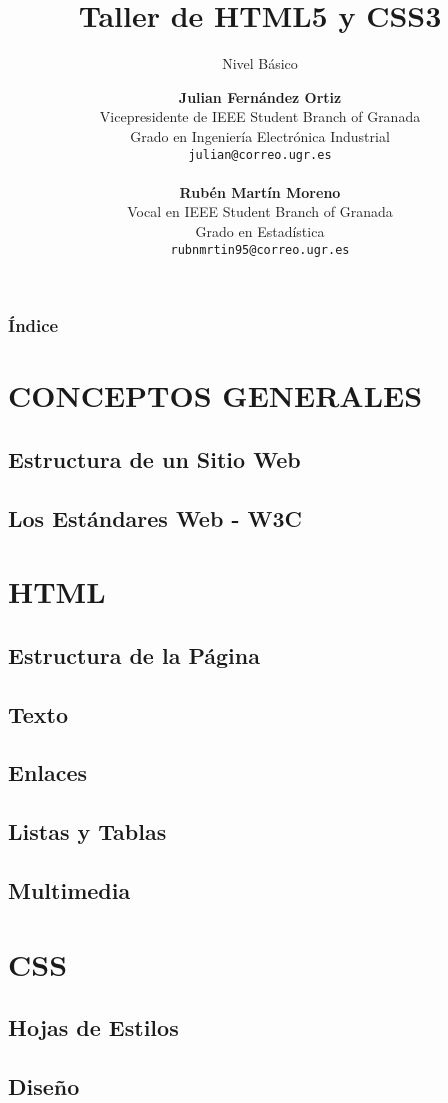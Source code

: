 \documentclass{beamer}
\title[HTML y CSS]{Taller de HTML5 y CSS3}
\subtitle{Nivel Básico}
\author[Julián Fernández, Rubén Martín]{
	\textbf{Julian Fernández Ortiz }
	\\
	\medskip
	\scriptsize{
	Vicepresidente de IEEE Student Branch of Granada\\
	Grado en Ingeniería Electrónica Industrial
	}	
	\\	
	\texttt{julian@correo.ugr.es}
	\\ \ \\
	\small{\textbf{Rubén Martín Moreno}}
	\\
	\medskip
	\scriptsize{
	Vocal en IEEE Student Branch of Granada\\
	Grado en Estadística
	}
	\\
	\texttt{rubnmrtin95@correo.ugr.es}
}
\date{}
\begin{document}
\frame{\titlepage}

\begin{frame}
  \frametitle{Índice}
  \begin{multicols}{2}
  \tableofcontents
  \end{multicols} 
\end{frame}

\section{CONCEPTOS GENERALES}
	\subsection{Estructura de un Sitio Web}
	\subsection{Los Estándares Web - W3C}
	
\section{HTML}
	\subsection{Estructura de la Página}
	\subsection{Texto}
	\subsection{Enlaces}
	\subsection{Listas y Tablas}
	\subsection{Multimedia}
	
\section{CSS}
	\subsection{Hojas de Estilos}
	\subsection{Diseño}
\end{document}
